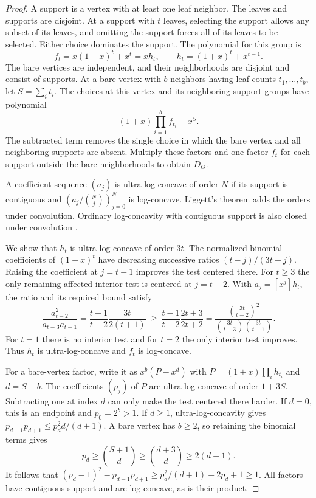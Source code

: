 \documentclass[10pt]{article}
\begin{document}
\begin{proof}
A support is a vertex with at least one leaf neighbor. The leaves and supports are disjoint. At a support with $t$ leaves, selecting the support allows any subset of its leaves, and omitting the support forces all of its leaves to be selected. Either choice dominates the support. The polynomial for this group is
\[
 f_t=x(1+x)^t+x^t=xh_t,\qquad h_t=(1+x)^t+x^{t-1}.
\]
The bare vertices are independent, and their neighborhoods are disjoint and consist of supports. At a bare vertex with $b$ neighbors having leaf counts $t_1,\ldots,t_b$, let $S=\sum_i t_i$. The choices at this vertex and its neighboring support groups have polynomial
\[
 (1+x)\prod_{i=1}^b f_{t_i}-x^S.
\]
The subtracted term removes the single choice in which the bare vertex and all neighboring supports are absent. Multiply these factors and one factor $f_t$ for each support outside the bare neighborhoods to obtain $D_G$.

A coefficient sequence $(a_j)$ is ultra-log-concave of order $N$ if its support is contiguous and $(a_j/\binom Nj)_{j=0}^N$ is log-concave. Liggett's theorem adds the orders under convolution. Ordinary log-concavity with contiguous support is also closed under convolution \cite{liggett}.

We show that $h_t$ is ultra-log-concave of order $3t$. The normalized binomial coefficients of $(1+x)^t$ have decreasing successive ratios $(t-j)/(3t-j)$. Raising the coefficient at $j=t-1$ improves the test centered there. For $t\ge3$ the only remaining affected interior test is centered at $j=t-2$. With $a_j=[x^j]h_t$, the ratio and its required bound satisfy
\[
 \frac{a_{t-2}^2}{a_{t-3}a_{t-1}}
 =\frac{t-1}{t-2}\frac{3t}{2(t+1)}
 \ \ge\ \frac{t-1}{t-2}\frac{2t+3}{2t+2}
 =\frac{\binom{3t}{t-2}^2}{\binom{3t}{t-3}\binom{3t}{t-1}}.
\]
For $t=1$ there is no interior test and for $t=2$ the only interior test improves. Thus $h_t$ is ultra-log-concave and $f_t$ is log-concave.

For a bare-vertex factor, write it as $x^b(P-x^d)$ with $P=(1+x)\prod_i h_{t_i}$ and $d=S-b$. The coefficients $(p_j)$ of $P$ are ultra-log-concave of order $1+3S$. Subtracting one at index $d$ can only make the test centered there harder. If $d=0$, this is an endpoint and $p_0=2^b>1$. If $d\ge1$, ultra-log-concavity gives $p_{d-1}p_{d+1}\le p_d^2d/(d+1)$. A bare vertex has $b\ge2$, so retaining the binomial terms gives
\[
 p_d\ge\binom{S+1}{d}\ge\binom{d+3}{d}\ge 2(d+1).
\]
It follows that $(p_d-1)^2-p_{d-1}p_{d+1}\ge p_d^2/(d+1)-2p_d+1\ge1$. All factors have contiguous support and are log-concave, as is their product.
\end{proof}
\end{document}
